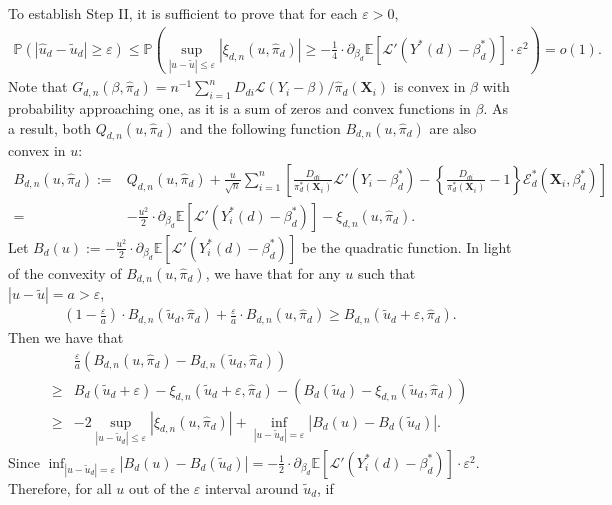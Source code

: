 \documentclass[11pt]{article}
\numberwithin{equation}{section}
\begin{document}
To establish Step II, it is sufficient to prove that for each $\varepsilon>0$,
\begin{align}\label{eq:Puhat-utilde>e}
	\mathbb{P}\left(|\widehat{u}_d-\widetilde{u}_d|\geq \varepsilon\right)\leq \mathbb{P}\left(\sup_{|u-\widetilde{u}|\leq \varepsilon}|\xi_{d,n}(u,\widehat{\pi}_d)|\geq -\frac{1}{4}\cdot \partial_{\beta_d}\mathbb{E}[\mathcal{L}'(Y^*(d)-\beta_d^*)] \cdot \varepsilon^2 \right)=o(1).
\end{align}
Note that $G_{d,n}(\beta,\widehat{\pi}_d)=n^{-1}\sum_{i=1}^nD_{di}\mathcal{L}(Y_i-\beta)/\widehat{\pi}_d(\boldsymbol{X}_{i})$ is convex in $\beta$ with probability approaching one, as it is a sum of zeros and convex functions in $\beta$. As a result, both $Q_{d,n}(u,\widehat{\pi}_d)$  and the following function $B_{d,n}(u,\widehat{\pi}_d)$ are also convex in $u$:
\begin{align*}
	B_{d,n}(u,\widehat{\pi}_d):=&Q_{d,n}(u,\widehat{\pi}_d)+\frac{u}{\sqrt{n}}\sum_{i=1}^n\left[\frac{D_{di}}{\pi_d^*(\boldsymbol{X}_i)}\mathcal{L}'(Y_i-\beta_d^*)-\left\{\frac{D_{di}}{\pi_d^*(\boldsymbol{X}_i)}-1\right\}\mathcal{E}_d^*(\boldsymbol{X}_i,\beta_d^*)\right]\\
	=&-\frac{u^2}{2}\cdot \partial_{\beta_d}\mathbb{E}[\mathcal{L}'(Y_i^*(d)-\beta_d^*)]-\xi_{d,n}(u,\widehat{\pi}_d).
\end{align*}
Let $B_{d}(u):=-\frac{u^2}{2}\cdot \partial_{\beta_d}\mathbb{E}[\mathcal{L}'(Y_i^*(d)-\beta_d^*)]$ be the quadratic function. In light of the convexity of $B_{d,n}(u,\widehat{\pi}_d)$, we have that for any $u$ such that $|u-\widetilde{u}|=a>\varepsilon$,
\begin{align*}
	\left(1-\frac{\varepsilon}{a}\right)\cdot B_{d,n}(\widetilde{u}_d,\widehat{\pi}_d)+\frac{\varepsilon}{a}\cdot B_{d,n}(u,\widehat{\pi}_d)\geq B_{d,n}(\widetilde{u}_d+\varepsilon,\widehat{\pi}_d).
\end{align*}
Then we have that
\begin{align*}
	&\frac{\varepsilon}{a}\left( B_{d,n}(u,\widehat{\pi}_d)-B_{d,n}(\widetilde{u}_d,\widehat{\pi}_d)\right)\\
	\geq& B_d(\widetilde{u}_d+\varepsilon)-\xi_{d,n}(\widetilde{u}_d+\varepsilon,\widehat{\pi}_d)-\left(B_d(\widetilde{u}_d)-\xi_{d,n}(\widetilde{u}_d,\widehat{\pi}_d)\right)\\
	\geq &-2\sup_{|u-\widetilde{u}_d|\leq \varepsilon}|\xi_{d,n}(u,\widehat{\pi}_d)|+\inf_{|u-\widetilde{u}_d|=\varepsilon}|B_d(u)-B_d(\widetilde{u}_d)|.
\end{align*}
Since $\inf_{|u-\widetilde{u}_d|=\varepsilon}|B_d(u)-B_d(\widetilde{u}_d)|=-\frac{1}{2}\cdot \partial_{\beta_d}\mathbb{E}[\mathcal{L}'(Y_i^*(d)-\beta_d^*)]\cdot \varepsilon^2$. Therefore, for all $u$ out of the $\varepsilon$ interval around $\widetilde{u}_d$, if
\end{document}
